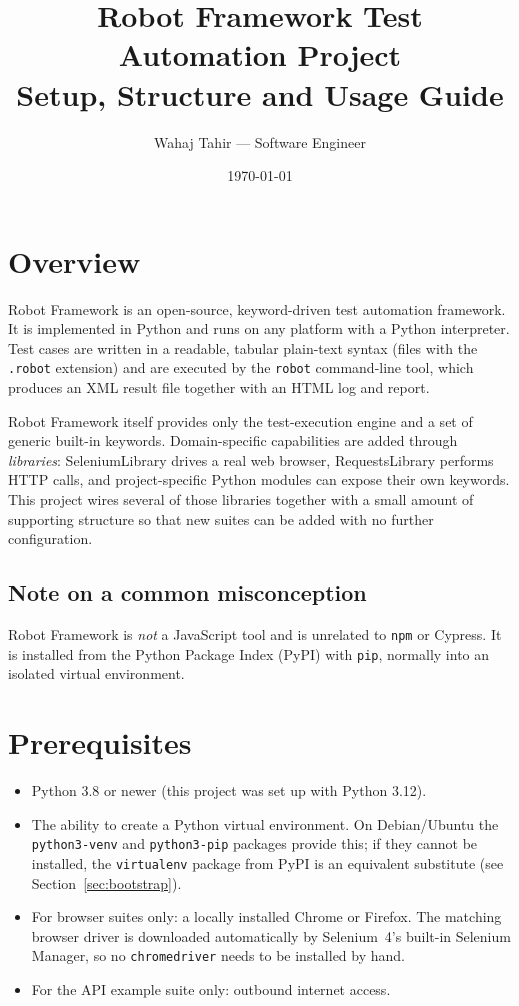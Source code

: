 \documentclass[a4paper,12pt]{article}
\title{Robot Framework Test Automation Project\\[0.5em]
       \large Setup, Structure and Usage Guide}
\author{Wahaj Tahir --- Software Engineer}
\date{\today}
\newcommand{\code}[1]{\texttt{#1}}
\begin{document}
\maketitle
\tableofcontents
\newpage

\section{Overview}

Robot Framework is an open-source, keyword-driven test automation framework.
It is implemented in Python and runs on any platform with a Python interpreter.
Test cases are written in a readable, tabular plain-text syntax (files with the
\code{.robot} extension) and are executed by the \code{robot} command-line tool,
which produces an XML result file together with an HTML log and report.

Robot Framework itself provides only the test-execution engine and a set of
generic built-in keywords. Domain-specific capabilities are added through
\emph{libraries}: SeleniumLibrary drives a real web browser, RequestsLibrary
performs HTTP calls, and project-specific Python modules can expose their own
keywords. This project wires several of those libraries together with a small
amount of supporting structure so that new suites can be added with no further
configuration.

\subsection{Note on a common misconception}

Robot Framework is \emph{not} a JavaScript tool and is unrelated to \code{npm}
or Cypress. It is installed from the Python Package Index (PyPI) with \code{pip},
normally into an isolated virtual environment.

\section{Prerequisites}

\begin{itemize}
  \item Python 3.8 or newer (this project was set up with Python 3.12).
  \item The ability to create a Python virtual environment. On Debian/Ubuntu the
        \code{python3-venv} and \code{python3-pip} packages provide this; if they
        cannot be installed, the \code{virtualenv} package from PyPI is an
        equivalent substitute (see Section~\ref{sec:bootstrap}).
  \item For browser suites only: a locally installed Chrome or Firefox. The
        matching browser driver is downloaded automatically by Selenium~4's
        built-in Selenium Manager, so no \code{chromedriver} needs to be
        installed by hand.
  \item For the API example suite only: outbound internet access.
\end{itemize}
\end{document}
